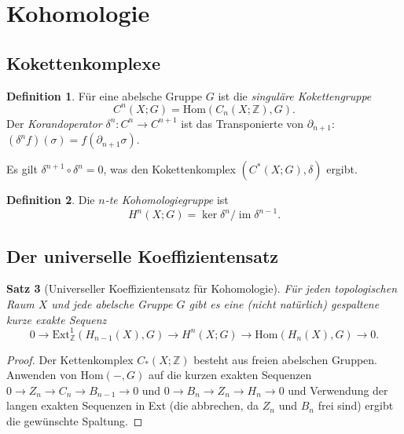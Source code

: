 \documentclass[12pt,a4paper]{amsart}
\newtheorem{theorem}{Satz}[section]
\theoremstyle{definition}
\newtheorem{definition}[theorem]{Definition}
\begin{document}
\section{Kohomologie}
\label{sec:kohomologie}

\subsection{Kokettenkomplexe}

\begin{definition}
F\"ur eine abelsche Gruppe $G$ ist die \emph{singul\"are Kokettengruppe}
\[
  C^n(X; G) = \mathrm{Hom}(C_n(X;\mathbb{Z}), G).
\]
Der \emph{Korandoperator} $\delta^n\colon C^n \to C^{n+1}$ ist das Transponierte
von $\partial_{n+1}$: $(\delta^n f)(\sigma) = f(\partial_{n+1}\sigma)$.
\end{definition}

Es gilt $\delta^{n+1} \circ \delta^n = 0$, was den Kokettenkomplex
$(C^*(X;G), \delta)$ ergibt.

\begin{definition}
Die \emph{$n$-te Kohomologiegruppe} ist
\[
  H^n(X; G) = \ker \delta^n / \operatorname{im} \delta^{n-1}.
\]
\end{definition}

\subsection{Der universelle Koeffizientensatz}

\begin{theorem}[Universeller Koeffizientensatz f\"ur Kohomologie]
\label{thm:uct}
F\"ur jeden topologischen Raum $X$ und jede abelsche Gruppe $G$ gibt es eine
(nicht nat\"urlich) gespaltene kurze exakte Sequenz
\[
  0 \to \mathrm{Ext}^1_\mathbb{Z}(H_{n-1}(X), G)
  \to H^n(X; G)
  \to \mathrm{Hom}(H_n(X), G)
  \to 0.
\]
\end{theorem}
\begin{proof}
Der Kettenkomplex $C_*(X;\mathbb{Z})$ besteht aus freien abelschen Gruppen.
Anwenden von $\mathrm{Hom}(-,G)$ auf die kurzen exakten Sequenzen
$0 \to Z_n \to C_n \to B_{n-1} \to 0$ und $0 \to B_n \to Z_n \to H_n \to 0$
und Verwendung der langen exakten Sequenzen in Ext (die abbrechen, da $Z_n$
und $B_n$ frei sind) ergibt die gew\"unschte Spaltung.
\end{proof}
\end{document}
